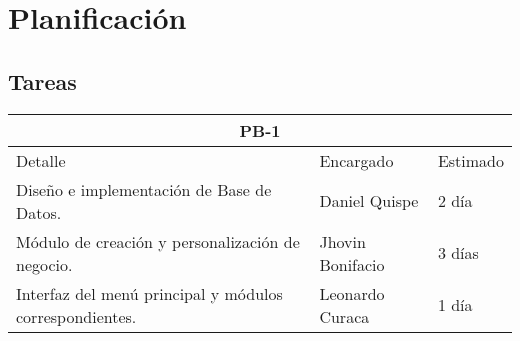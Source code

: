 \chapter{Planificación}
\section{Tareas}
\begin{table}[htbp]
	\begin{center}
		\begin{tabular}{|p{10cm} | p{2cm} | p{2cm}|}
			\hline
			\multicolumn{3}{|c|}{PB-1}\\
			\hline
			Detalle & Encargado & Estimado \\
			\hline
			Diseño e implementación de Base de Datos. & Daniel Quispe & 2 día \\
			\hline
			Módulo de creación y personalización de negocio. & Jhovin Bonifacio & 3 días \\
			\hline
			Interfaz del menú principal y módulos correspondientes. & Leonardo Curaca & 1 día \\
			\hline	
		\end{tabular}
	\end{center}
\end{table}